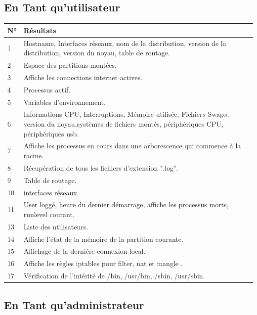 \documentclass[11pt,a4paper,titlepage, oneside]{article}
\begin{document}
	\subsection{{\color{blue}En Tant qu'utilisateur}}
		\begin{tabular}{|l|p{12cm}|}
			\hline
				\textbf{N°}&\textbf{Résultats}\\
			\hline
				1 & Hostname, Interfaces réseaux, nom de la distribution, version de la distribution, version du noyau, table de routage.\\
			\hline
				2 & Espace des partitions montées.\\
			\hline
				3 & Affiche les connections internet actives.\\
			\hline
				4 & Processus actif.\\
			\hline
				5 & Variables d'environnement.\\
			\hline
				6 & Informations CPU, Interruptions, Mémoire utilisée, Fichier\(s\) Swap\(s\), version du noyau,systèmes de fichiers montés, périphériques CPU, périphériques usb.\\
			\hline
				7 & Affiche les processus en cours dans une arborescence qui commence à la racine.\\
			\hline
				8 & Récupération de tous les fichiers d'extension ".log".\\
			\hline
				9 & Table de routage.\\
			\hline
				10 & interfaces réseaux.\\
			\hline
				11 & User loggé, heure du dernier démarrage, affiche les processus morts, runlevel courant.\\
			\hline
				13 & Liste des utilisateurs.\\
			\hline
				14 & Affiche l'état de la mémoire de la partition courante.\\
			\hline
				15 & Affichage de la derniére connexion local.\\
			\hline
				16 & Affiche les règles iptables pour filter, nat et mangle .\\
			\hline
				17 & Vérification de l'intérité de /bin, /usr/bin, /sbin, /usr/sbin.\\
			\hline
		\end{tabular}
			
	\subsection{{\color{blue}En Tant qu'administrateur}}
	
\newpage
\end{document}
